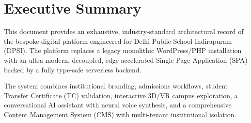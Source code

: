 \documentclass[12pt, a4paper, oneside]{report}
\def\textbf#1{#1}
\begin{document}
\section{Executive Summary}

This document provides an exhaustive, industry-standard architectural record of
the bespoke digital platform engineered for \textbf{Delhi Public School
Indirapuram (DPSI)}.  The platform replaces a legacy monolithic WordPress/PHP
installation with an ultra-modern, decoupled, edge-accelerated
Single-Page Application (SPA) backed by a fully type-safe serverless backend.

The system combines institutional branding, admissions workflows, student
Transfer Certificate (TC) validation, interactive 3D/VR campus exploration, a
conversational AI assistant with neural voice synthesis, and a comprehensive
Content Management System (CMS) with multi-tenant institutional isolation.
\end{document}
